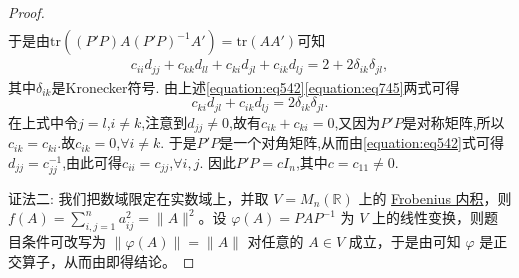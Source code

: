 \documentclass[../../main.tex]{subfiles}
\begin{document}
\begin{proof}
\begin{align*}
\end{align*}
于是由$\text{tr}((P'P)A(P'P)^{-1}A')=\text{tr}(AA')$可知
\begin{align}\label{equation:eq745}
c_{ii}d_{jj}+c_{kk}d_{ll}+c_{ki}d_{jl}+c_{ik}d_{lj}=2 + 2\delta_{ik}\delta_{jl},  
\end{align}
其中\(\delta_{ik}\)是Kronecker符号. 由上述\eqref{equation:eq542}\eqref{equation:eq745}两式可得
\[
c_{ki}d_{jl}+c_{ik}d_{lj}=2\delta_{ik}\delta_{jl}.
\]
在上式中令\(j = l\),\(i\neq k\),注意到\(d_{jj}\neq0\),故有\(c_{ik}+c_{ki}=0\),又因为\(P'P\)是对称矩阵,所以\(c_{ik}=c_{ki}\).故\(c_{ik}=0\),\(\forall i\neq k\). 于是\(P'P\)是一个对角矩阵,从而由\eqref{equation:eq542}式可得\(d_{jj}=c_{jj}^{-1}\),由此可得\(c_{ii}=c_{jj}\),\(\forall i,j\). 因此\(P'P = cI_n\),其中\(c = c_{11}\neq0\).

{\color{blue}证法二:}
我们把数域限定在实数域上，并取 \(V = M_n(\mathbb{R})\) 上的 \hyperlink{Frobenius 内积}{Frobenius 内积}，则 \(f(A)=\sum_{i,j = 1}^{n}a_{ij}^2=\|A\|^2\)。设 \(\varphi(A)=PAP^{-1}\) 为 \(V\) 上的线性变换，则题目条件可改写为 \(\|\varphi(A)\|=\|A\|\) 对任意的 \(A\in V\) 成立，于是由可知 \(\varphi\) 是正交算子，从而由即得结论。
\end{proof}
\end{document}
